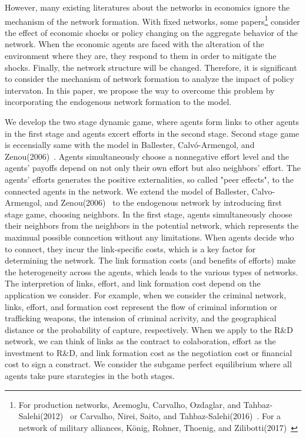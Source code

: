\documentclass[12pt]{article}
\theoremstyle{definition}
\begin{document}
However, many existing literatures about the networks in economics ignore the mechanism of the network formation.
With fixed networks, some papers\footnote{For production networks, Acemoglu, Carvalho, Ozdaglar, and Tahbaz‐Salehi(2012)~\cite{origin} or Carvalho, Nirei, Saito, and Tahbaz-Salehi(2016)~\cite{nirei}. For a network of military alliances, K\"{o}nig, Rohner, Thoenig, and Zilibotti(2017)~\cite{conflict}} consider the effect of economic shocks or policy changing on the aggregate behavior of the network.
When the economic agents are faced with the alteration of the environment where they are, they respond to them in order to mitigate the shocks.
Finally, the network structure will be changed.
Therefore, it is significant to consider the mechanism of network formation to analyze the impact of policy intervaton.
In this paper, we propose the way to overcome this problem by incorporating the endogenous network formation to the model.

We develop the two stage dynamic game, where agents form links to other agents in the first stage and agents excert efforts in the second stage.
Second stage game is eccensially same with the model in Ballester, Calv\'{o}-Armengol, and Zenou(2006)~\cite{whowho}.
Agents simultaneously choose a nonnegative effort level and the agents' payoffs depend on not only their own effort but also neighbors' effort.
The agents' efforts generates the positive externalities, so called "peer effects", to the connected agents in the network.
We extend the model of Ballester, Calvo-Armengol, and Zenou(2006)~\cite{whowho} to the endogenous network by introducing first stage game, choosing neighbors.
In the first stage, agents simultaneously choose their neighbors from the neighbors in the potential network, which represents the maximual possible conncetion without any limitations.
When agents decide who to connect, they incur the link-specific costs, which is a key factor for determining the network.
The link formation costs (and benefits of efforts) make the heterogeneity across the agents, which leads to the various types of networks.
The interpretion of links, effort, and link formation cost depend on the application we consider.
For example, when we consider the criminal network, links, effort, and formation cost represent the flow of criminal informtion or trafficking weapons, the intension of criminal acrivity, and the geographical distance or the probability of capture, respectively.
When we apply to the R\&D network, we can think of links as the contract to colaboration, effort as the investment to R\&D, and link formation cost as the negotiation cost or financial cost to sign a constract.
We consider the subgame perfect equilibrium where all agents take pure starategies in the both stages.
\end{document}
